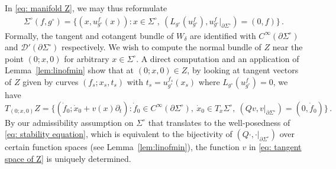 \documentclass[11pt]{amsart}
\theoremstyle{definition}
\numberwithin{equation}{section}
\newcommand{\p}{\partial}
\begin{document}
In \eqref{eq: manifold Z}, we may thus reformulate 
\begin{eqnarray}\label{eq: min surf as graph}
\Sigma^\circ(f,g^\circ) = \{(x,u^{f}_{g^\circ}(x))\colon x\in \Sigma^\circ,\ (L_{g^\circ}(u^{f}_{g^\circ}),u^{f}_{g^\circ}\vert_{\p\Sigma^\circ})=(0,f)\}\,.
\end{eqnarray}
Formally, the tangent and cotangent bundle of $W_\delta$ are identified with $C^\infty(\partial \Sigma^\circ)$ and $\mathcal{D}'(\partial \Sigma^\circ)$ respectively. %
We wish to compute the normal bundle of $Z$ near the point $(0; x,0)$ for arbitrary $x\in \Sigma^\circ$. A direct computation and an application of Lemma~\ref{lem:linofmin} show that at $(0;x, 0)\in Z$, by looking at tangent vectors of $Z$ given by curves $(f_s;x_s,t_s)$ with $t_s = u_{g^{\circ}}^{f_s}(x_s)$ where $L_{g^{\circ}}(u^f_{g^{\circ}}) = 0$, we have 
\begin{equation}\label{eq: tangent space of Z}
T_{(0; x,0)}Z = \{(\dot f_0; \dot x_0  + v(x) \partial_t) \colon \dot{f}_0 \in C^\infty(\partial\Sigma^\circ), \ \dot x_0 \in T_x\Sigma^\circ,\ (Qv,v\vert_{\p\Sigma^\circ})=(0,\dot f_0)\}\,.%
\end{equation}
By our admissibility assumption on $\Sigma^\circ$ that translates to the well-posedness of \eqref{eq: stability equation}, which is equivalent to the bijectivity of $(Q\cdot,\cdot\vert_{\p\Sigma^\circ})$ over certain function spaces (see Lemma~\ref{lem:linofmin}), the function $v$ in \eqref{eq: tangent space of Z} is uniquely determined. 
\end{document}
